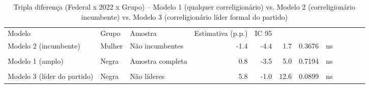 \begin{table}[!h]
\centering
\caption{Tripla diferença (Federal x 2022 x Grupo) -- Modelo 1 (qualquer correligionário) vs. Modelo 2 (correligionário incumbente) vs. Modelo 3 (correligionário líder formal do partido)}
\centering
\begin{tabular}[t]{lllrrrrl}
\toprule
Modelo & Grupo & Amostra & Estimativa (p.p.) & IC 95%
\midrule
{} &  &  &  &  &  &  & \\
Modelo 2 (incumbente) & Mulher & Não incumbentes & -1.4 & -4.4 & 1.7 & 0.3676 & ns\\
 &  &  &  &  &  &  & \\
Modelo 1 (amplo) & Negra & Amostra completa & 0.8 & -3.5 & 5.0 & 0.7194 & ns\\
 &  &  &  &  &  &  & \\
\addlinespace
Modelo 3 (líder do partido) & Negra & Não líderes & 5.8 & -1.0 & 12.6 & 0.0899 & ns\\
\bottomrule
\end{tabular}
\end{table}
